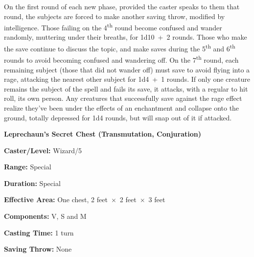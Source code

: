 \begin{multicols}{2}
On the first round of each new phase, provided the caster speaks to them that round, the subjects are forced to make another saving throw, modified by intelligence.  Those failing on the 4\textsuperscript{th} round become confused and wander randomly, muttering under their breaths, for 1d10~+~2 rounds.  Those who make the save continue to discuss the topic, and make saves during the 5\textsuperscript{th} and 6\textsuperscript{th} rounds to avoid becoming confused and wandering off.  On the 7\textsuperscript{th} round, each remaining subject (those that did not wander off) must save to avoid flying into a rage, attacking the nearest other subject for 1d4~+~1 rounds.  If only one creature remains the subject of the spell and fails its save, it attacks, with a regular to hit roll, its own person.  Any creatures that successfully save against the rage effect realize they've been under the effects of an enchantment and collapse onto the ground, totally depressed for 1d4 rounds, but will snap out of it if attacked.

\vspace{1em}

\noindent
\begin{minipage}{\columnwidth}

\noindent \textbf{Leprechaun's Secret Chest (Transmutation, Conjuration)}

\noindent \textbf{Caster/Level:} Wizard/5

\noindent \textbf{Range:} Special

\noindent \textbf{Duration:} Special

\noindent \textbf{Effective Area:} One chest, 2 feet~$\times$~2 feet~$\times$~3 feet

\noindent \textbf{Components:} V, S and M

\noindent \textbf{Casting Time:} 1 turn

\noindent \textbf{Saving Throw:} None

\end{minipage}


\end{multicols}
